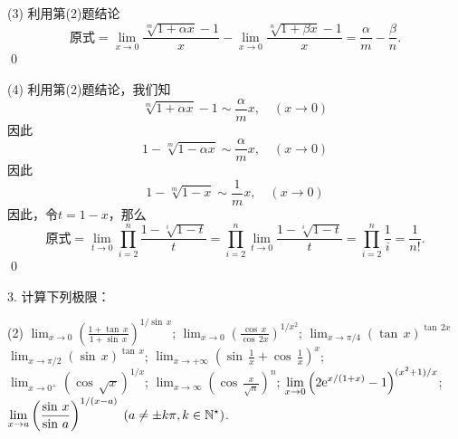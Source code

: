 (3) \solve 利用第(2)题结论
\begin{equation}
    \text{原式} = \lim_{x \to 0} \frac{\sqrt[m]{1+\alpha x}-1}{x} - \lim_{x \to 0} \frac{\sqrt[n]{1+\beta x}-1}{x} = \frac{\alpha}{m} - \frac{\beta}{n}. 
\end{equation}
\qed\bigskip

(4) \solve 利用第(2)题结论，我们知
\begin{equation}
    \sqrt[m]{1+\alpha x} - 1 \sim \frac{\alpha}{m} x, \quad (x \to 0)
\end{equation}
因此
\begin{equation}
    1 - \sqrt[m]{1-\alpha x} \sim \frac{\alpha}{m} x, \quad (x \to 0)
\end{equation}
因此
\begin{equation}
    1 - \sqrt[m]{1-x} \sim \frac{1}{m}x, \quad (x \to 0)
\end{equation}
因此，令$t = 1-x$，那么
\begin{equation}
    \text{原式} = \lim_{t \to 0} \prod_{i=2}^{n} \frac{1-\sqrt[i]{1-t}}{t} = \prod_{i=2}^{n}\lim_{t \to 0} \frac{1-\sqrt[i]{1-t}}{t} = \prod_{i=2}^n \frac{1}{i} = \frac{1}{n!}.
\end{equation}
\qed\bigskip

3. 计算下列极限：
\begin{tasks}(2)
    \task $\displaystyle\lim_{x \to 0}\left(\displaystyle\frac{1+\tan \, x}{1+\sin \, x}\right)^{1/ \sin \, x}$;
    \task $\displaystyle\lim_{x \to 0} \left(\displaystyle\frac{\cos \, x}{\cos \, 2x}\right)^{1/x^2}$;
    \task $\displaystyle\lim_{x \to \pi /4} \left(\tan \, x\right)^{\tan \, 2x}$ 
    \task $\displaystyle\lim_{x \to \pi /2} \left(\sin \, x\right)^{\tan \, x}$;
    \task $\displaystyle\lim_{x \to +\infty} \left(\sin \, \displaystyle\frac{1}{x} + \cos \, \displaystyle\frac{1}{x}\right)^x$;
    \task $\displaystyle\lim_{x \to 0^+} \left(\cos \, \sqrt{x}\right)^{1/x}$;
    \task $\displaystyle\lim_{x \to \infty} \left(\cos \, \displaystyle\frac{x}{\sqrt{n}}\right)^n$;
    \task $\displaystyle\lim_{x \to 0} \left(2 \mathrm{e}^{x/(1+x)}-1\right)^{(x^2+1)/x}$;
    \task $\displaystyle\lim_{x \to a}\left(\displaystyle\frac{\sin \, x}{\sin \, a}\right)^{1/(x-a)} \; (a \neq \pm k \pi, k \in \mathbb{N}^\star)$.
\end{tasks}